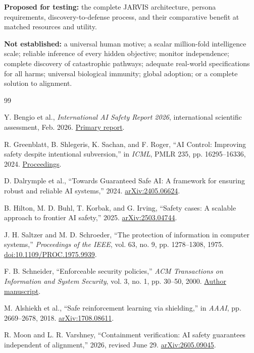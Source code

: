 \documentclass[10pt,twocolumn,letterpaper]{article}
\begin{document}
\textbf{Proposed for testing:} the complete JARVIS architecture, persona requirements, discovery-to-defense process, and their comparative benefit at matched resources and utility.

\textbf{Not established:} a universal human motive; a scalar million-fold intelligence scale; reliable inference of every hidden objective; monitor independence; complete discovery of catastrophic pathways; adequate real-world specifications for all harms; universal biological immunity; global adoption; or a complete solution to alignment.

\begin{thebibliography}{99}
\small
\raggedright
\setlength{\itemsep}{2pt}
 Y. Bengio et al., \emph{International AI Safety Report 2026}, international scientific assessment, Feb. 2026. \href{https://internationalaisafetyreport.org/publication/international-ai-safety-report-2026}{Primary report}.

 R. Greenblatt, B. Shlegeris, K. Sachan, and F. Roger, ``AI Control: Improving safety despite intentional subversion,'' in \emph{ICML}, PMLR 235, pp. 16295--16336, 2024. \href{https://proceedings.mlr.press/v235/greenblatt24a.html}{Proceedings}.

 D. Dalrymple et al., ``Towards Guaranteed Safe AI: A framework for ensuring robust and reliable AI systems,'' 2024. \href{https://arxiv.org/abs/2405.06624}{arXiv:2405.06624}.

 B. Hilton, M. D. Buhl, T. Korbak, and G. Irving, ``Safety cases: A scalable approach to frontier AI safety,'' 2025. \href{https://arxiv.org/abs/2503.04744}{arXiv:2503.04744}.

 J. H. Saltzer and M. D. Schroeder, ``The protection of information in computer systems,'' \emph{Proceedings of the IEEE}, vol. 63, no. 9, pp. 1278--1308, 1975. \href{https://doi.org/10.1109/PROC.1975.9939}{doi:10.1109/PROC.1975.9939}.

 F. B. Schneider, ``Enforceable security policies,'' \emph{ACM Transactions on Information and System Security}, vol. 3, no. 1, pp. 30--50, 2000. \href{https://www.cs.cornell.edu/fbs/publications/EnfSecPols.pdf}{Author manuscript}.

 M. Alshiekh et al., ``Safe reinforcement learning via shielding,'' in \emph{AAAI}, pp. 2669--2678, 2018. \href{https://arxiv.org/abs/1708.08611}{arXiv:1708.08611}.

 R. Moon and L. R. Varshney, ``Containment verification: AI safety guarantees independent of alignment,'' 2026, revised June 29. \href{https://arxiv.org/abs/2605.09045}{arXiv:2605.09045}.


\end{thebibliography}
\end{document}
